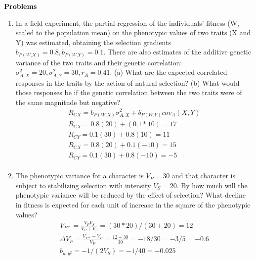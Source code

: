 \documentclass[12pt]{amsart}
\begin{document}
{\large \bf Problems}   
\begin{enumerate}
\item In a field experiment, the partial regression of the individuals' fitness (W, scaled to the population mean) on the phenotypic values of two traits (X and  Y) was estimated, obtaining the selection gradients $b_{P(W.X)} = 0.8, b_{P(W.Y)}=0.1$. There are also estimates of the additive genetic variance of the two traits and their genetic correlation: $\sigma^2_{A,X} = 20, \sigma^2_{A,Y} = 30, r_A = 0.41$. (a) What are the expected correlated responses in the traits by the action of natural selection? (b) What would those responses be if the genetic correlation between the two traits were of the same magnitude but negative?
\begin{gather*}
R_{CX} = b_{P(W.X)}\sigma^2_{A,X} + b_{P(W.Y)}cov_A(X,Y)\\
R_{CX} = 0.8(20) + (0.1*10) = 17\\ 
R_{CY} = 0.1(30) + 0.8(10) = 11\\
R_{CX} = 0.8(20) + 0.1(-10) = 15\\
R_{CY} = 0.1(30) + 0.8(-10) = -5\\
\end{gather*}

\item The phenotypic variance for a character is $V_P = 30$ and that character is subject to stabilizing selection with intensity $V_S = 20$. By how much will the phenotypic variance will be reduced by the effect of selection? What decline in fitness is expected for each unit of increase in the square of the phenotypic values?
\begin{gather*}
V_{P*} = \frac{V_PV_S}{V_P + V_S} = (30*20)/(30+20) = 12\\
\Delta V_P = \frac{V_{P*}-V_P}{V_P} = \frac{12 - 30}{30} = -18/30 = -3/5 = -0.6\\
b_{w.y^2} = -1/(2V_S) = -1/40 = -0.025
\end{gather*}

\end{enumerate}
\end{document}
